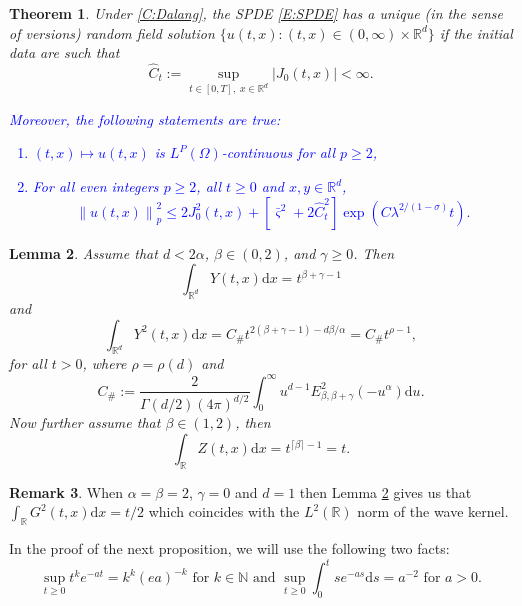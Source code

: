 \documentclass[a4paper,11pt]{article}
\numberwithin{equation}{section}
\theoremstyle{plain}
\newtheorem{theorem}{Theorem}[section]
\newtheorem{lemma}[theorem]{Lemma}
\theoremstyle{definition}
\newtheorem{remark}[theorem]{Remark}
\newcommand{\ud}{\ensuremath{\mathrm{d} }}
\newcommand{\Norm}[1]{\left\|  #1   \right\|}
\newcommand{\R}{\mathbb{R}}
\numberwithin{NQ}{section}
\numberwithin{LQ}{section}
\numberwithin{ZQ}{section}
\begin{document}
	\begin{theorem}
		\label{T:SolveabilityGenLip}
		Under \eqref{C:Dalang}, the SPDE \eqref{E:SPDE} has a unique (in the sense of versions) random field solution $\{u(t,x) : (t,x) \in (0,\infty) \times \R^d \}$ if the initial data are such that 
		\begin{equation}
		\hat{C}_t := \sup_{t\in[0,T],\; x\in \R^d} |J_0(t,x)| < \infty.
		\end{equation}	
		\textcolor{blue}{Moreover, the following statements are true:
			\begin{enumerate}
				\item $(t,x) \mapsto u(t,x)$ is $L^P(\Omega)$-continuous for all $p \ge 2$,
				\item For all even integers $p \ge 2$, all $t \ge 0$ and $x,y\in\R^d$,
				\begin{equation}
				\Norm{u(t,x)}_p^2 \le 2J_0^2(t,x) + \left[ \bar{\varsigma}^2 + 2 \hat{C}_t^2 \right]\exp(C \lambda^{2/(1-\sigma)}t).
				\end{equation}
		\end{enumerate}}
		
	\end{theorem}
	\begin{lemma}{\normalfont \cite[Theorem 4.1 and Lemma 5.5]{CHN19}}
		\label{L:1and2normYZ}
		Assume that $d < 2\alpha$, $\beta \in (0,2)$, and $\gamma \ge 0$. Then 
		\[
		\int_{\R^d} Y(t,x) \ud x = t^{\beta+\gamma -1 }
		\]
		and
		\[
		\int_{\R^d} Y^2(t,x) \ud x = C_{\#} t^{2(\beta+\gamma-1)-d\beta/\alpha} = C_{\#} t^{\rho -1} ,
		\]
		for all $t > 0$, where $\rho = \rho(d)$ and 
		\[
		C_{\#} := \frac{2}{\Gamma(d/2)(4 \pi )^{d/2}} \int_0^\infty u^{d-1}E^2_{\beta,\beta + \gamma}(-u^\alpha) \ud u.
		\]
		Now further assume that $\beta \in (1,2)$, then 
		\[
		\int_{\R} Z(t,x) \ud x= t^{\lceil \beta \rceil -1} = t. 
		\]
	\end{lemma}
	\begin{remark}
		When $\alpha = \beta = 2$,  $\gamma = 0$ and $d=1$ then Lemma \ref{L:1and2normYZ} gives us that $\int_{\R} G^2(t,x) \ud x = t/2$ which coincides with the $L^2(\R)$ norm of the wave kernel. 
	\end{remark}
	In the proof of the next proposition, we will use the following two facts:
	\begin{equation}
	\label{E:SUPidentities}
	\sup_{t\ge0} t^ke^{-at} = k^k(ea)^{-k} \text{ for }k \in \mathbb{N} \text{ and } \sup_{t \ge 0} \int_0^t s e^{-as} \ud s = a^{-2} \text{ for } a>0.
	\end{equation}
	
\end{document}
